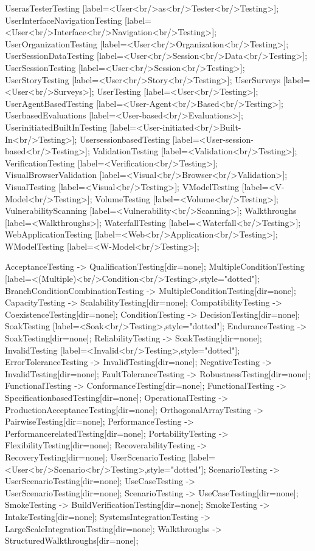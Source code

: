 \documentclass{article}
\begin{document}
{UserasTesterTesting [label=<User<br/>as<br/>Tester<br/>Testing>];
UserInterfaceNavigationTesting [label=<User<br/>Interface<br/>Navigation<br/>Testing>];
UserOrganizationTesting [label=<User<br/>Organization<br/>Testing>];
UserSessionDataTesting [label=<User<br/>Session<br/>Data<br/>Testing>];
UserSessionTesting [label=<User<br/>Session<br/>Testing>];
UserStoryTesting [label=<User<br/>Story<br/>Testing>];
UserSurveys [label=<User<br/>Surveys>];
UserTesting [label=<User<br/>Testing>];
UserAgentBasedTesting [label=<User-Agent<br/>Based<br/>Testing>];
UserbasedEvaluations [label=<User-based<br/>Evaluations>];
UserinitiatedBuiltInTesting [label=<User-initiated<br/>Built-In<br/>Testing>];
UsersessionbasedTesting [label=<User-session-based<br/>Testing>];
ValidationTesting [label=<Validation<br/>Testing>];
VerificationTesting [label=<Verification<br/>Testing>];
VisualBrowserValidation [label=<Visual<br/>Browser<br/>Validation>];
VisualTesting [label=<Visual<br/>Testing>];
VModelTesting [label=<V-Model<br/>Testing>];
VolumeTesting [label=<Volume<br/>Testing>];
VulnerabilityScanning [label=<Vulnerability<br/>Scanning>];
Walkthroughs [label=<Walkthroughs>];
WaterfallTesting [label=<Waterfall<br/>Testing>];
WebApplicationTesting [label=<Web<br/>Application<br/>Testing>];
WModelTesting [label=<W-Model<br/>Testing>];

AcceptanceTesting -> QualificationTesting[dir=none];
MultipleConditionTesting [label=<(Multiple)<br/>Condition<br/>Testing>,style="dotted"];
BranchConditionCombinationTesting -> MultipleConditionTesting[dir=none];
CapacityTesting -> ScalabilityTesting[dir=none];
CompatibilityTesting -> CoexistenceTesting[dir=none];
ConditionTesting -> DecisionTesting[dir=none];
SoakTesting [label=<Soak<br/>Testing>,style="dotted"];
EnduranceTesting -> SoakTesting[dir=none];
ReliabilityTesting -> SoakTesting[dir=none];
InvalidTesting [label=<Invalid<br/>Testing>,style="dotted"];
ErrorToleranceTesting -> InvalidTesting[dir=none];
NegativeTesting -> InvalidTesting[dir=none];
FaultToleranceTesting -> RobustnessTesting[dir=none];
FunctionalTesting -> ConformanceTesting[dir=none];
FunctionalTesting -> SpecificationbasedTesting[dir=none];
OperationalTesting -> ProductionAcceptanceTesting[dir=none];
OrthogonalArrayTesting -> PairwiseTesting[dir=none];
PerformanceTesting -> PerformancerelatedTesting[dir=none];
PortabilityTesting -> FlexibilityTesting[dir=none];
RecoverabilityTesting -> RecoveryTesting[dir=none];
UserScenarioTesting [label=<User<br/>Scenario<br/>Testing>,style="dotted"];
ScenarioTesting -> UserScenarioTesting[dir=none];
UseCaseTesting -> UserScenarioTesting[dir=none];
ScenarioTesting -> UseCaseTesting[dir=none];
SmokeTesting -> BuildVerificationTesting[dir=none];
SmokeTesting -> IntakeTesting[dir=none];
SystemsIntegrationTesting -> LargeScaleIntegrationTesting[dir=none];
Walkthroughs -> StructuredWalkthroughs[dir=none];

}
\end{document}
